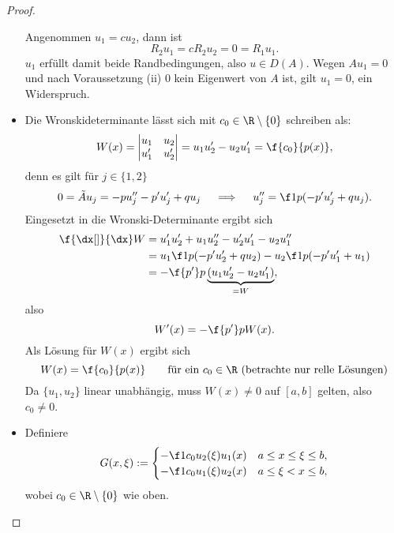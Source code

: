 \begin{st}
\begin{proof}
\begin{seg}[(ii)$\implies$(i)]
\begin{itemize}
					Angenommen $u_1 = c u_2$, dann ist
					\[
						R_2 u_1 = c R_2 u_2 = 0 = R_1u_1.
					\]
					$u_1$ erfüllt damit beide Randbedingungen, also $u \in D(A)$.
					Wegen $Au_1 = 0$ und nach Voraussetzung (ii) $0$ kein Eigenwert von $A$ ist, gilt $u_1 = 0$, ein Widerspruch.
				\item
					Die Wronskideterminante lässt sich mit $c_0 \in \R \setminus \{0\}$ schreiben als:
					\[
						W(x) = \begin{vmatrix}
							u_1 & u_2 \\
							u_1' & u_2'
						\end{vmatrix}
						= u_1u_2' - u_2u_1' = \f {c_0}{p(x)},
					\]
					denn es gilt für $j\in \{1,2\}$
					\[
						0 = \tilde A u_j = -pu_j'' - p'u_j' + qu_j
						\quad\implies\quad
						u_j'' = \f 1{p}(-p'u_j' + qu_j).
					\]
					Eingesetzt in die Wronski-Determinante ergibt sich
					\begin{align*}
						\f {\dx[]}{\dx} W
						&= u_1'u_2' + u_1u_2'' - u_2'u_1' - u_2u_1'' \\
						&= u_1 \f 1p (-p'u_2' + qu_2) - u_2 \f 1p (-p'u_1' + u_1) \\
						&= -\f {p'}p \underbrace{(u_1u_2' - u_2u_1')}_{=W},
					\end{align*}
					also
					\[
						W'(x) = - \f {p'}p W(x).
					\]
					Als Lösung für $W(x)$ ergibt sich
					\[
						W(x) = \f {c_0}{p(x)}
						\qquad \text{für ein $c_0\in \R$ (betrachte nur relle Lösungen)}
					\]
					Da $\{u_1,u_2\}$ linear unabhängig, muss $W(x) \neq 0$ auf $[a,b]$ gelten, also $c_0\neq 0$.
				\item
					Definiere
					\[
						G(x,\xi) := \begin{cases}
							-\f 1{c_0} u_2(\xi)u_1(x) & a \le x \le \xi \le b, \\
							-\f 1{c_0} u_1(\xi)u_2(x) & a \le \xi < x \le b,
						\end{cases}
					\]
					wobei $c_0 \in \R \setminus \{0\}$ wie oben.


\end{itemize}
\end{seg}
\end{proof}
\end{st}
